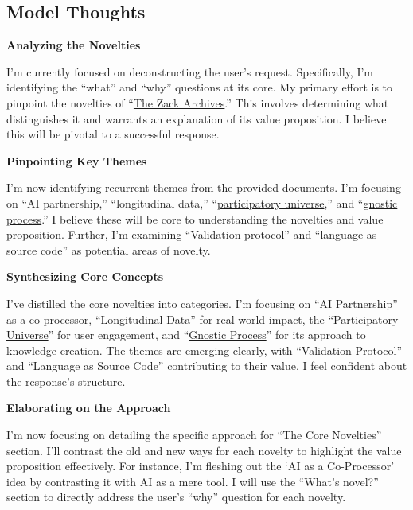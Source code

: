 \documentclass{article}
\begin{document}
\subsection*{Model Thoughts}\label{model-thoughts}

\textbf{Analyzing the Novelties}

I'm currently focused on deconstructing the user's request. Specifically, I'm identifying the ``what'' and ``why'' questions at its core. My primary effort is to pinpoint the novelties of ``\hyperlink{gloss:the_zack_archives}{The Zack Archives}.'' This involves determining what distinguishes it and warrants an explanation of its value proposition. I believe this will be pivotal to a successful response.

\textbf{Pinpointing Key Themes}

I'm now identifying recurrent themes from the provided documents. I'm focusing on ``AI partnership,'' ``longitudinal data,'' ``\hyperlink{gloss:participatory_universe}{participatory universe},'' and ``\hyperlink{gloss:gnostic_process}{gnostic process}.'' I believe these will be core to understanding the novelties and value proposition. Further, I'm examining ``Validation protocol'' and ``language as source code'' as potential areas of novelty.

\textbf{Synthesizing Core Concepts}

I've distilled the core novelties into categories. I'm focusing on ``AI Partnership'' as a co-processor, ``Longitudinal Data'' for real-world impact, the ``\hyperlink{gloss:participatory_universe}{Participatory Universe}'' for user engagement, and ``\hyperlink{gloss:gnostic_process}{Gnostic Process}'' for its approach to knowledge creation. The themes are emerging clearly, with ``Validation Protocol'' and ``Language as Source Code'' contributing to their value. I feel confident about the response's structure.

\textbf{Elaborating on the Approach}

I'm now focusing on detailing the specific approach for ``The Core Novelties'' section. I'll contrast the old and new ways for each novelty to highlight the value proposition effectively. For instance, I'm fleshing out the `AI as a Co-Processor' idea by contrasting it with AI as a mere tool. I will use the ``What's novel?'' section to directly address the user's ``why'' question for each novelty.
\end{document}
